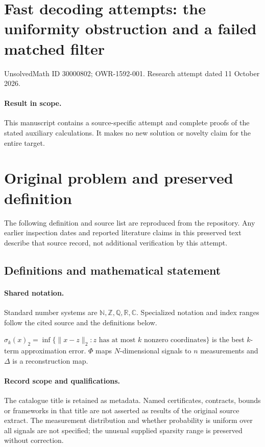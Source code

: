 \documentclass[11pt]{article}
\begin{document}
\section*{Fast decoding attempts: the uniformity obstruction and a failed matched filter}
\noindent UnsolvedMath ID 30000802; OWR-1592-001. Research attempt dated 11 October 2026.
\paragraph{Result in scope.}This manuscript contains a source-specific attempt and complete proofs of the stated auxiliary calculations. It makes no new solution or novelty claim for the entire target.
\section{Original problem and preserved definition}
The following definition and source list are reproduced from the repository. Any earlier inspection dates and reported literature claims in this preserved text describe that source record, not additional verification by this attempt.
\subsection{Definitions and mathematical statement}

\paragraph{Shared notation.}Standard number systems are $\mathbb N,\mathbb Z,\mathbb Q,\mathbb R,\mathbb C$. Specialized notation and index ranges follow the cited source and the definitions below.


$\sigma_k(x)_2=\inf\{\lVert x-z\rVert_2:z\text{ has at most }k\text{ nonzero coordinates}\}$ is the best $k$-term approximation error. $\Phi$ maps $N$-dimensional signals to $n$ measurements and $\Delta$ is a reconstruction map.
\paragraph{Record scope and qualifications.}
The catalogue title is retained as metadata. Named certificates, contracts, bounds or frameworks in that title are not asserted as results of the original source extract.
The measurement distribution and whether probability is uniform over all signals are not specified; the unusual supplied sparsity range is preserved without correction.
\end{document}
